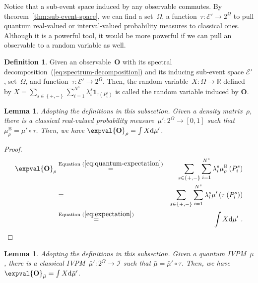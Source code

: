 \documentclass[12pt]{iopart}
\theoremstyle{plain}
\newtheorem{lemma}[thm]{Lemma}
\theoremstyle{definition}
\newtheorem{definition}[thm]{Definition}
\theoremstyle{remark}
\newcommand{\events}{\ensuremath{\mathcal{E}}}
\begin{document}
Notice that a sub-event space induced by any observable commutes.
By theorem~\ref{thm:sub-event-space}, we can find a set~$\Omega$,
a function~$\tau:\events'\rightarrow2^{\Omega}$ to pull quantum
real-valued or interval-valued probability measures to classical ones.
Although it is a powerful tool, it would be more powerful if we can
pull an observable to a random variable as well.

\begin{definition}Given an observable~$\mathbf{O}$ with its spectral
decomposition~(\ref{eq:spectrum-decomposition}) and its inducing
sub-event space $\events'$, set~$\Omega$, and function~$\tau:\events'\rightarrow2^{\Omega}$.
Then, the random variable~$X:\Omega\rightarrow\mathbb{R}$ defined
by $X=\sum_{s\in\left\{ +,-\right\} }\sum_{i=1}^{N^{s}}\lambda_{i}^{s}\mathbf{1}_{\tau\left(P_{i}^{s}\right)}$
is called the random variable induced by $\mathbf{O}$.\end{definition}

\begin{lemma}\label{lemma:real-expectation-value-between-classical-quantum}Adopting
the definitions in this subsection. Given a density matrix~$\rho$,
there is a classical real-valued probability measure~$\mu':2^{\Omega}\rightarrow\left[0,1\right]$
such that $\mu_{\rho}^{\mathrm{B}}=\mu'\circ\tau$. Then, we have
$\expval{\mathbf{O}}_{\rho}=\int X\rmd\mu'$.\end{lemma}

\begin{proof}
\begin{eqnarray*}
\expval{\mathbf{O}}_{\rho} & \stackrel{\textrm{Equation }(\ref{eq:quantum-expectation})}{=} & \sum_{s\in\left\{ +,-\right\} }\sum_{i=1}^{N^{s}}\lambda_{i}^{s}\mu_{\rho}^{\mathrm{B}}\left(P_{i}^{s}\right)\\
 & = & \sum_{s\in\left\{ +,-\right\} }\sum_{i=1}^{N^{s}}\lambda_{i}^{s}\mu'\left(\tau\left(P_{i}^{s}\right)\right)\\
 & \stackrel{\textrm{Equation }(\ref{eq:expectation})}{=} & \int X\rmd\mu'\textrm{ .}
\end{eqnarray*}
\end{proof}

\begin{lemma}\label{lemma:interval-expectation-value-between-classical-quantum}Adopting
the definitions in this subsection. Given a quantum IVPM~$\bar{\mu}$,
there is a classical IVPM~$\bar{\mu}':2^{\Omega}\rightarrow\mathscr{I}$
such that $\bar{\mu}=\bar{\mu}'\circ\tau$. Then, we have $\expval{\mathbf{O}}_{\bar{\mu}}=\int X\rmd\bar{\mu}'$.\end{lemma}
\end{document}
